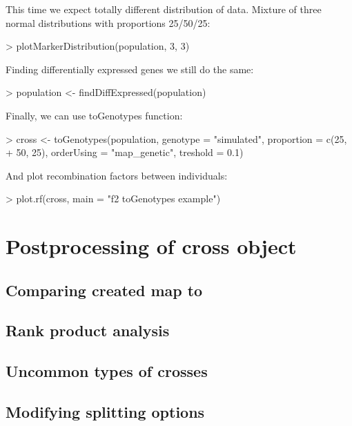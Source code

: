 \documentclass{article}
\begin{document}
{\noindent}This time we expect totally different distribution of data. Mixture of three normal distributions with proportions 25/50/25:
\begin{Schunk}
\begin{Sinput}
> plotMarkerDistribution(population, 3, 3)
\end{Sinput}
\end{Schunk}

{\noindent}Finding differentially expressed genes we still do the same:
\begin{Schunk}
\begin{Sinput}
> population <- findDiffExpressed(population)
\end{Sinput}
\end{Schunk}

\newpage
{\noindent}Finally, we can use toGenotypes function:
\begin{Schunk}
\begin{Sinput}
> cross <- toGenotypes(population, genotype = "simulated", proportion = c(25, 
+     50, 25), orderUsing = "map_genetic", treshold = 0.1)
\end{Sinput}
\end{Schunk}

{\noindent}And plot recombination factors between individuals:
\begin{Schunk}
\begin{Sinput}
> plot.rf(cross, main = "f2 toGenotypes example")
\end{Sinput}
\end{Schunk}

\newpage
\section{Postprocessing of cross object}

\subsection{Comparing created map to }
\blindtext
\subsection{Rank product analysis}
\blindtext
\subsection{Uncommon types of crosses}
\blindtext
\subsection{Modifying splitting options}
\blindtext
\end{document}
